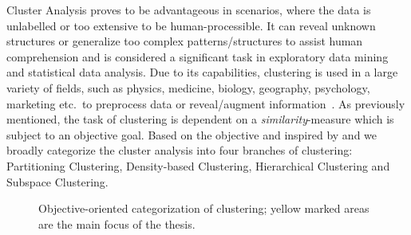 Cluster Analysis proves to be advantageous in scenarios, where the data is unlabelled or too extensive to be human-processible. It can reveal unknown structures or generalize too complex patterns/structures to assist human comprehension and is considered a significant task in exploratory data mining and statistical data analysis. Due to its capabilities, clustering is used in a large variety of fields, such as physics, medicine, biology, geography, psychology, marketing etc.\ to preprocess data or reveal/augment information~\cite{kriegel2009clustering}.
As previously mentioned, the task of clustering is dependent on a \textit{similarity}-measure which is subject to an objective goal. Based on the objective and inspired by \textcite{validationhalkidi2001clustering} and \textcite[Ch.10.1.3]{han2011data} we broadly categorize the cluster analysis into four branches of clustering: Partitioning Clustering, Density-based Clustering, Hierarchical Clustering and Subspace Clustering. 

\begin{figure}
    \centering
    \caption{Objective-oriented categorization of clustering; yellow marked areas are the main focus of the thesis.}
    \label{fig:clusteringtree}
\end{figure}


